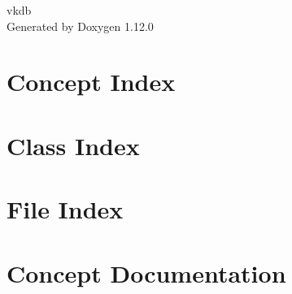 \documentclass[twoside]{book}
\newcommand{\+}{\discretionary{\mbox{\scriptsize$\hookleftarrow$}}{}{}}
\newcommand{\clearemptydoublepage}{%
    \newpage{\pagestyle{empty}\cleardoublepage}%
  }
\begin{document}
  \raggedbottom
    \hypersetup{pageanchor=false,
                bookmarksnumbered=true,
                pdfencoding=unicode
               }
  \begin{titlepage}
  \vspace*{7cm}
  \begin{center}%
  {\Large vkdb}\\
  \vspace*{1cm}
  {\large Generated by Doxygen 1.12.0}\\
  \end{center}
  \end{titlepage}
  \clearemptydoublepage
  \tableofcontents
  \clearemptydoublepage
  \hypersetup{pageanchor=true}




\chapter{Concept Index}

\chapter{Class Index}

\chapter{File Index}

\chapter{Concept Documentation}










\end{document}
